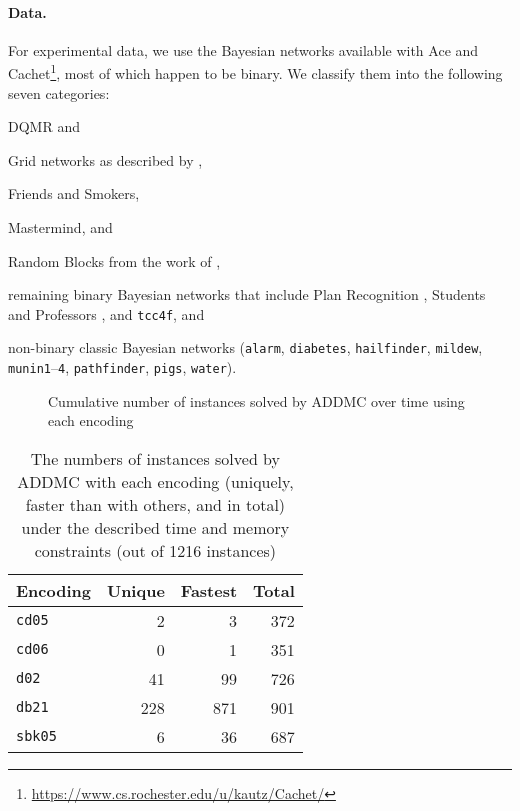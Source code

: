 \documentclass[letterpaper]{article} %
\theoremstyle{definition}
\theoremstyle{remark}
\begin{document}
{\paragraph{Data.} For experimental data, we use the Bayesian networks available
with Ace and
Cachet\footnote{\url{https://www.cs.rochester.edu/u/kautz/Cachet/}}, most of
which happen to be binary. We classify them into the following seven categories:
\begin{itemize*}
\item DQMR and
\item Grid networks as described by \citet{DBLP:conf/aaai/SangBK05},
\item Friends and Smokers,
\item Mastermind, and
\item Random Blocks from the work of \citet{DBLP:journals/ijar/ChaviraDJ06},
\item remaining binary Bayesian networks that include Plan Recognition
  \cite{DBLP:conf/aaai/SangBK05}, Students and Professors
  \cite{DBLP:journals/ijar/ChaviraDJ06}, and \texttt{tcc4f}, and
\item non-binary classic Bayesian networks (\texttt{alarm}, \texttt{diabetes},
  \texttt{hailfinder}, \texttt{mildew}, \texttt{munin1}--\texttt{4},
  \texttt{pathfinder}, \texttt{pigs}, \texttt{water}).
\end{itemize*}

\begin{figure}
  \centering
  \caption{Cumulative number of instances solved by ADDMC over time using each
    encoding}
\end{figure}


\begin{table}
  \centering
  \caption{The numbers of instances solved by ADDMC with each encoding
    (uniquely, faster than with others, and in total) under the described time
    and memory constraints (out of 1216 instances)}%
  \begin{tabular}{lrrr}
    \toprule
    Encoding & Unique & Fastest & Total \\
    \midrule
    \texttt{cd05} & 2 & 3 & 372 \\
    \texttt{cd06} & 0 & 1 & 351 \\
    \texttt{d02} & 41 & 99 & 726 \\
    \texttt{db21} & 228 & 871 & 901 \\
    \texttt{sbk05} & 6 & 36 & 687 \\
    \bottomrule
  \end{tabular}
\end{table}

}
\end{document}

